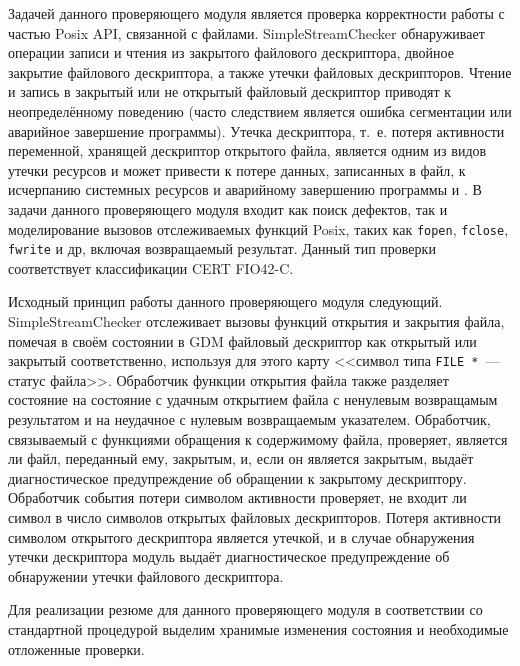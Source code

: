 Задачей данного проверяющего модуля является проверка корректности работы с частью Posix API, связанной с файлами. SimpleStreamChecker обнаруживает операции записи и чтения из закрытого файлового дескриптора, двойное закрытие файлового дескриптора, а также утечки файловых дескрипторов. Чтение и запись в закрытый или не открытый файловый дескриптор приводят к неопределённому поведению (часто следствием является ошибка сегментации или аварийное завершение программы). Утечка дескриптора, т.~е. потеря активности переменной, хранящей дескриптор открытого файла, является одним из видов утечки ресурсов и может привести к потере данных, записанных в файл, к исчерпанию системных ресурсов и аварийному завершению программы и . В задачи данного проверяющего модуля входит как поиск дефектов, так и моделирование вызовов отслеживаемых функций Posix, таких как \texttt{fopen}, \texttt{fclose}, \texttt{fwrite} и др, включая возвращаемый результат. Данный тип проверки соответствует классификации CERT FIO42-C.

Исходный принцип работы данного проверяющего модуля следующий. SimpleStreamChecker отслеживает вызовы функций открытия и закрытия файла, помечая в своём состоянии в GDM файловый дескриптор как открытый или закрытый соответственно, используя для этого карту <<символ типа \texttt{FILE~*}~--- статус файла>>. Обработчик функции открытия файла также разделяет состояние на состояние с удачным открытием файла с ненулевым возвращамым результатом и на неудачное с нулевым возвращаемым указателем. Обработчик, связываемый с функциями обращения к содержимому файла, проверяет, является ли файл, переданный ему, закрытым, и, если он является закрытым, выдаёт диагностическое предупреждение об обращении к закрытому дескриптору. Обработчик события потери символом активности проверяет, не входит ли символ в число символов открытых файловых дескрипторов. Потеря активности символом открытого дескриптора является утечкой, и в случае обнаружения утечки дескриптора модуль выдаёт диагностическое предупреждение об обнаружении утечки файлового дескриптора.

Для реализации резюме для данного проверяющего модуля в соответствии со стандартной процедурой выделим хранимые изменения состояния и необходимые отложенные проверки.

